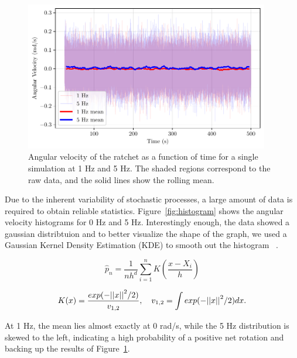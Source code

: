 \begin{figure}[h!]
\begin{center}
\includegraphics[width=0.95\textwidth]{figures/time_series.pdf}
\end{center}
\caption[Angular velocity as a function of time.]
{Angular velocity of the ratchet as a function of time for a single simulation at 1 Hz and 5 Hz. The shaded regions correspond to the raw data, and the solid lines show the rolling mean.}
\label{fig:velocityvstime}
\end{figure}

Due to the inherent variability of stochastic processes, a large amount of data is required to obtain reliable statistics. Figure~\ref{fig:histogram} shows the angular velocity histograms for 0 Hz and 5 Hz. Interestingly enough, the data showed a gaussian distribtuion and to better visualize the shape of the graph, we used a Gaussian Kernel Density Estimation (KDE) to smooth out the histogram ~\cite{chen2017tutorial}. 

\begin{equation}
  \hat{p}_n = \frac{1}{nh^d} \displaystyle\sum_{i=1}^{n}K \left(\frac{x - X_i}{h}\right)
  \label{eq:kde}
\end{equation}

\begin{equation}
  K(x) = \frac{exp(-\abs{\abs{x}}^2/2)}{v_{1,2}}, \quad v_{1,2} = \displaystyle\int exp(-\abs{\abs{x}}^2/2)dx.
  \label{eq:gaussiankernel}
\end{equation}

At 1 Hz, the mean lies almost exactly at 0 rad/s, while the 5 Hz distribution is skewed to the left, indicating a high probability of a positive net rotation and backing up the results of Figure~\ref{fig:velocityvstime}. 


